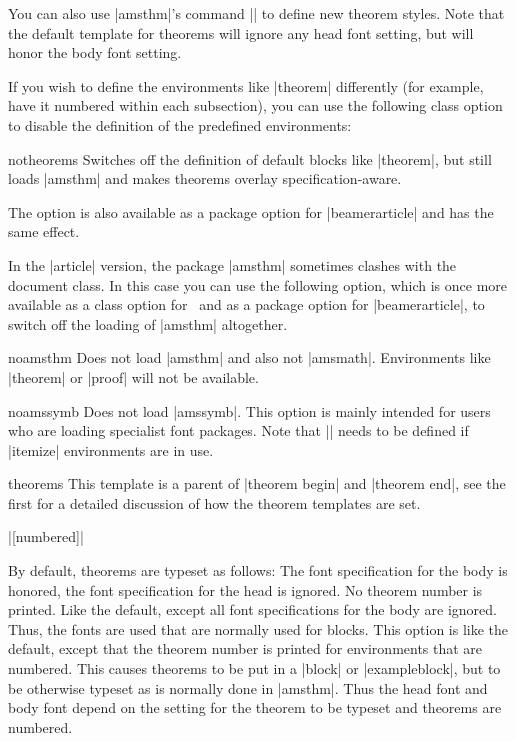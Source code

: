 You can also use |amsthm|'s command |\newtheoremstyle| to define new theorem styles. Note that the default template for theorems will ignore any head font setting, but will honor the body font setting.

If you wish to define the environments like |theorem| differently (for example, have it numbered within each subsection), you can use the following class option to disable the definition of the predefined environments:

\begin{classoption}{notheorems}
  Switches off the definition of default blocks like |theorem|, but still loads |amsthm| and makes theorems overlay specification-aware.
\end{classoption}

The option is also available as a package option for |beamerarticle| and has the same effect.

\articlenote
In the |article| version, the package |amsthm| sometimes clashes with the document class. In this case you can use the following option, which is once more available as a class option for \beamer\ and as a package option for |beamerarticle|, to switch off the loading of |amsthm| altogether.

\begin{classoption}{noamsthm}
  Does not load |amsthm| and also not |amsmath|. Environments like |theorem| or |proof| will not be available.
\end{classoption}

\begin{classoption}{noamssymb}
  Does not load |amssymb|. This option is mainly intended for users who are loading specialist font packages. Note that |\blacktriangleright| needs to be defined if |itemize| environments are in use.
\end{classoption}


\begin{element}{theorems}\semiyes\no\no
  This template is a parent of |theorem begin| and |theorem end|, see the first for a detailed discussion of how the theorem templates are set.

  \example
  |[numbered]|

  \begin{templateoptions}
    By default, theorems are typeset as follows: The font specification for the body is honored, the font specification for the head is ignored. No theorem number is printed.
    Like the default, except all font specifications for the body are ignored. Thus, the fonts are used that are normally used for blocks.
    This option is like the default, except that the theorem number is printed for environments that are numbered.
    This causes theorems to be put in a |block| or |exampleblock|, but to be otherwise typeset as is normally done in |amsthm|. Thus the head font and body font depend on the setting for the theorem to be typeset and theorems are numbered.
  \end{templateoptions}
\end{element}


